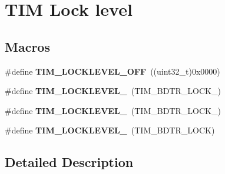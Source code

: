 \hypertarget{group___t_i_m___lock__level}{\section{T\-I\-M Lock level}
\label{group___t_i_m___lock__level}
}
\subsection*{Macros}
\begin{DoxyCompactItemize}
\item 
\hypertarget{group___t_i_m___lock__level_ga304aece56a9391a4d9b1016144d98fbd}{\#define {\bfseries T\-I\-M\-\_\-\-L\-O\-C\-K\-L\-E\-V\-E\-L\-\_\-\-O\-F\-F}~((uint32\-\_\-t)0x0000)}\label{group___t_i_m___lock__level_ga304aece56a9391a4d9b1016144d98fbd}

\item 
\hypertarget{group___t_i_m___lock__level_ga46dc7705788ba2ce5135c43b998ef4dd}{\#define {\bfseries T\-I\-M\-\_\-\-L\-O\-C\-K\-L\-E\-V\-E\-L\-\_}~(T\-I\-M\-\_\-\-B\-D\-T\-R\-\_\-\-L\-O\-C\-K\-\_)}\label{group___t_i_m___lock__level_ga46dc7705788ba2ce5135c43b998ef4dd}

\item 
\hypertarget{group___t_i_m___lock__level_ga03a5ed2aded43ccfe7ab12a9dd53d251}{\#define {\bfseries T\-I\-M\-\_\-\-L\-O\-C\-K\-L\-E\-V\-E\-L\-\_}~(T\-I\-M\-\_\-\-B\-D\-T\-R\-\_\-\-L\-O\-C\-K\-\_)}\label{group___t_i_m___lock__level_ga03a5ed2aded43ccfe7ab12a9dd53d251}

\item 
\hypertarget{group___t_i_m___lock__level_gaa1afed375c27151608e388fdf4a57a13}{\#define {\bfseries T\-I\-M\-\_\-\-L\-O\-C\-K\-L\-E\-V\-E\-L\-\_}~(T\-I\-M\-\_\-\-B\-D\-T\-R\-\_\-\-L\-O\-C\-K)}\label{group___t_i_m___lock__level_gaa1afed375c27151608e388fdf4a57a13}

\end{DoxyCompactItemize}


\subsection{Detailed Description}
